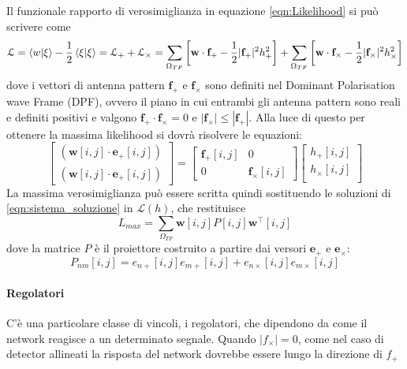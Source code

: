 Il funzionale rapporto di verosimiglianza in equazione \ref{eqn:Likelihood} si può scrivere come
\begin{equation}
	\mathcal{L} = \braket{w}{\xi} - \frac{1}{2} \braket{\xi}{\xi} = \mathcal{L}_+ + \mathcal{L}_\times = \sum_{\Omega_{TF}}\left[ \mathbf{w} \cdot \mathbf{f}_+ - \frac{1}{2}|\mathbf{f}_+|^2h_+^2\right] + \sum_{\Omega_{TF}}\left[ \mathbf{w} \cdot \mathbf{f}_\times - \frac{1}{2}|\mathbf{f}_\times|^2h_\times^2\right]
	\label{eqn:label_separated}
\end{equation}
dove i vettori di antenna pattern $\mathbf{f}_+$ e $\mathbf{f}_\times$ sono definiti nel Dominant Polarisation wave Frame (DPF), ovvero il piano in cui entrambi gli antenna pattern sono reali e definiti positivi e valgono $\mathbf{f}_+ \cdot \mathbf{f}_\times = 0$ e $ |\mathbf{f}_\times| \leq |\mathbf{f}_+|$.  Alla luce di questo per ottenere la massima likelihood si dovrà risolvere le equazioni:
\begin{equation}
	\begin{bmatrix}
	(\mathbf{w}[i,j]\cdot \mathbf{e}_+[i,j])\\
	(\mathbf{w}[i,j]\cdot \mathbf{e}_+[i,j])
	\end{bmatrix}
	=
	\begin{bmatrix}
	\mathbf{f}_+[i,j]	&0\\
	0					&\mathbf{f}_\times[i,j]
	\end{bmatrix}
	\begin{bmatrix}
	h_+[i,j]\\
	h_\times[i,j]\\
	\end{bmatrix}
	\label{eqn:sistema_soluzione}
\end{equation}
La massima verosimiglianza può essere scritta quindi sostituendo le soluzioni di \ref{eqn:sistema_soluzione} in $\mathcal{L}(h)$, che restituisce
\begin{equation}
	L_{max} = \sum_{\Omega_{TF}}\mathbf{w}[i,j]P[i,j]\mathbf{w}^\intercal[i,j]
\end{equation}
dove la matrice $P$ è il proiettore costruito a partire dai versori $\mathbf{e}_+$ e $\mathbf{e}_\times$:
\begin{equation}
	P_{nm}[i,j]=e_{n+}[i,j]e_{m+}[i,j]+e_{n\times}[i,j]e_{m\times}[i,j]
	\label{eqn:proiection}
\end{equation}

\paragraph{Regolatori} C'è una particolare classe di vincoli, i regolatori, che dipendono da come il network reagisce a un determinato segnale. Quando $|f_\times|=0$, come nel caso di detector allineati la risposta del network dovrebbe essere lungo la direzione di $f_+$
